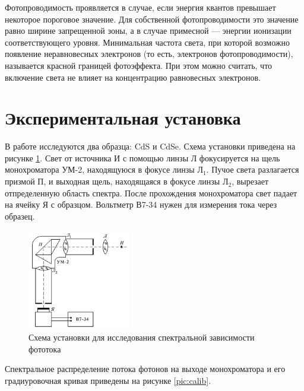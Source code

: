 \documentclass[12pt]{kiarticle}
\begin{document}
	Фотопроводимость проявляется в случае, если энергия квантов превышает некоторое пороговое значение. Для собственной фотопроводимости это значение равно ширине запрещенной зоны, а в случае примесной --- энергии ионизации соответствующего уровня. Минимальная частота света, при которой возможно появление неравновесных электронов (то есть, электронов фотопроводимости), называется красной границей фотоэффекта. При этом можно считать, что включение света не влияет на концентрацию равновесных электронов. 
	

	\section{Экспериментальная установка}
	
	В работе исследуются два образца: CdS и CdSe. Схема установки приведена на рисунке \ref{pic:scheme}. Свет от источника И с помощью линзы Л фокусируется на щель монохроматора УМ-2, находящуюся в фокусе линзы Л$_1$. Пучое света разлагается призмой П, и выходная щель, находящаяся в фокусе линзы Л$_2$, вырезает отпределенную область спектра. После прохождения монохроматора свет падает на ячейку Я с образцом. Вольтметр В7-34 нужен для измерения тока через образец. 
	
	\begin{figure}[h]
		\centering	
		\includegraphics[width=0.4\textwidth]{lab.png}
		\caption{Схема установки для исследования спектральной зависимости фототока}
		\label{pic:scheme}
	\end{figure} 
	
	Спектральное распределение потока фотонов на выходе монохроматора и его градиуровочная кривая приведены на рисунке \ref{pic:calib}.
	
\end{document}
